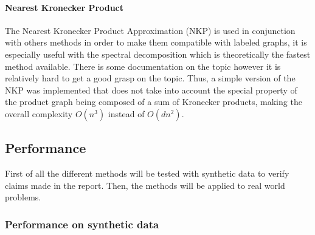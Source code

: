 \documentclass{article}
\theoremstyle{definition}
\begin{document}
\paragraph{Nearest Kronecker Product}
The Nearest Kronecker Product Approximation (NKP)\cite{van1993approximation} is used in conjunction with others methods in order to make them compatible with labeled graphs, it is especially useful with the spectral decomposition which is theoretically the fastest method available. There is some documentation on the topic however it is relatively hard to get a good grasp on the topic. Thus, a simple version of the NKP was implemented that does not take into account the special property of the product graph being composed of a sum of Kronecker products, making the overall complexity $O(n^3)$ instead of $O(dn^2)$.
	

\subsection{Performance}
First of all the different methods will be tested with synthetic data to verify claims made in the report. Then, the methods will be applied to real world problems. 
\subsubsection{Performance on synthetic data}
\end{document}
